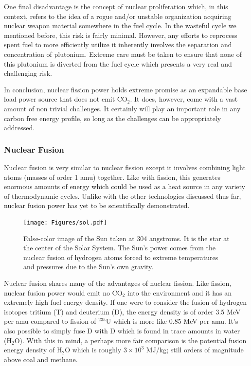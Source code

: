		One final disadvantage is the concept of nuclear proliferation which, in this context, refers to the idea of a rogue and/or unstable organization acquiring nuclear weapon material somewhere in the fuel cycle. \cite{bibid} In the wasteful cycle we mentioned before, this risk is fairly minimal. However, any efforts to reprocess spent fuel to more efficiently utilize it inherently involves the separation and concentration of plutonium. \cite{bibid} Extreme care must be taken to ensure that none of this plutonium is diverted from the fuel cycle which presents a very real and challenging risk.
		
		In conclusion, nuclear fission power holds extreme promise as an expandable base load power source that does not emit CO$_2$. It does, however, come with a vast amount of non trivial challenges. It certainly will play an important role in any carbon free energy profile, so long as the challenges can be appropriately addressed.
		
		
	\subsubsection{Nuclear Fusion}
	
		Nuclear fusion is very similar to nuclear fission except it involves combining light atoms (masses of order 1 amu) together. \cite{bibid} Like with fission, this generates enormous amounts of energy which could be used as a heat source in any variety of thermodynamic cycles. Unlike with the other technologies discussed thus far, nuclear fusion power has yet to be scientifically demonstrated. \cite{bibid}
		
		\begin{figure}[h!]
			\centering
			\texttt{[image: Figures/sol.pdf]}
			\caption[The Sun]{False-color image of the Sun taken at 304 angstroms. It is the star at the center of the Solar System. The Sun's power comes from the nuclear fusion of hydrogen atoms forced to extreme temperatures and pressures due to the Sun's own gravity. \cite{woolfson_origin_2000, Image_Sun}}
		\end{figure}
		
		Nuclear fusion shares many of the advantages of nuclear fission. Like fission, nuclear fusion power would emit no CO$_2$ into the environment and it has an extremely high fuel energy density. If one were to consider the fusion of hydrogen isotopes tritium (T) and deuterium (D), the energy density is of order 3.5 MeV per amu compared to fission of $^{235}$U which is more like 0.85 MeV per amu. \cite{bibid} It's also possible to simply fuse D with D which is found in trace amounts in water (H$_2$O). With this in mind, a perhaps more fair comparison is the potential fusion energy density of H$_2$O which is roughly $3\times10^3$ MJ/kg; still orders of magnitude above coal and methane. \cite{bibid}
		
